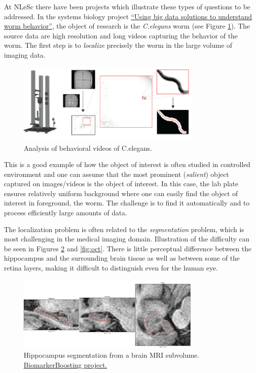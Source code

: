 At NLeSc there have been projects which illustrate these types of questions to be addressed. In the systems biology project \href{https://blog.surf.nl/en/eyr4-blog-5-using-big-data-solutions-to-understand-worm-behavior/}{``Using big data solutions to understand worm behavior''}, the object of research is the {\em C.elegans} worm (see Figure \ref{fig:Celegans}). The source data are high resolution and long videos capturing the behavior of the worm. The first step is to {\em localize} precisely the worm in the large volume of imaging data. 
\begin{figure}[H]
\begin{center}
\includegraphics[width=0.8\textwidth]{fig/Celegans}
\end{center}
\caption{Analysis of behavioral videos of C.elegans.}
\label{fig:Celegans}
\end{figure}
This is a good example of how the object of interest is often studied in controlled environment and one can assume that the most prominent ({\em salient}) object captured on images/videos is the object of interest. In this case, the lab plate ensures relatively uniform background where one can easily find the object of interest in foreground, the worm. The challenge is to find it automatically and to process efficiently large amounts of data.

The localization problem is often related to the {\em segmentation} problem, which is most challenging in the medical imaging domain. Illustration of the difficulty can be seen in Figures \ref{fig:hippo} and \ref{fig:oct}. There is little perceptual difference between the hippocampus and the surrounding brain tissue as well as between some of the retina layers, making it difficult to distinguish even for the human eye.

\begin{figure}[H]
\begin{center}
\includegraphics[width=0.8\textwidth]{fig/hippo}
\end{center}
\caption{Hippocampus segmentation from a brain MRI subvolume. \href{https://www.esciencecenter.nl/project/biomarker-boosting}{BiomarkerBoosting project.}}
\label{fig:hippo}
\end{figure}


